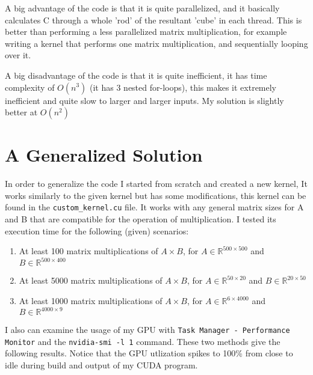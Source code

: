 \documentclass[]{report}
\begin{document}
A big advantage of the code is that it is quite parallelized, and it basically calculates C through a whole 'rod' of the resultant 'cube' in each thread. This is better than performing a less parallelized matrix multiplication, for example writing a kernel that performs one matrix multiplication, and sequentially looping over it.

A big disadvantage of the code is that it is quite inefficient, it has time complexity of $O(n^3)$ (it has 3 nested for-loops), this makes it extremely inefficient and quite slow to larger and larger inputs. My solution is slightly better at $O(n^2)$

\section*{A Generalized Solution}

In order to generalize the code I started from scratch and created a new kernel, It works similarly to the given kernel but has some modifications, this kernel can be found in the \texttt{custom\_kernel.cu} file. It works with any general matrix sizes for A and B that are compatible for the operation of multiplication. I tested its execution time for the following (given) scenarios:
\begin{enumerate}[label=\roman*)]
	\item At least 100 matrix multiplications of $A\times B$, for $A\in\mathbb{R}^{500\times500}$ and $B\in\mathbb{R}^{500\times400}$
	\item At least 5000 matrix multiplications of $A\times B$, for $A\in\mathbb{R}^{50\times20}$ and $B\in\mathbb{R}^{20\times50}$
	\item At least 1000 matrix multiplications of $A\times B$, for $A\in\mathbb{R}^{6\times4000}$ and $B\in\mathbb{R}^{4000\times9}$
\end{enumerate}

I also can examine the usage of my GPU with \texttt{Task Manager - Performance Monitor} and the \texttt{nvidia-smi -l 1} command. These two methods give the following results. Notice that the GPU utlization spikes to 100\% from close to idle during build and output of my CUDA program.
\end{document}
